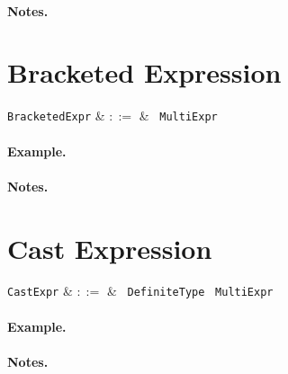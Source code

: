 \paragraph{Notes.}


\section{Bracketed Expression}
\label{c_expr_bracketed}

\begin{syntax}
\verb+BracketedExpr+ & $::=$ & \token{(}\ \verb+MultiExpr+\ \token{)}\\
\end{syntax}

\paragraph{Example.}

\paragraph{Notes.}


\section{Cast Expression}
\label{c_expr_cast}

\begin{syntax}
\verb+CastExpr+ & $::=$ & \token{(}\ \verb+DefiniteType+ \token{)}\ \verb+MultiExpr+\\
\end{syntax}

\paragraph{Example.}

\paragraph{Notes.}


